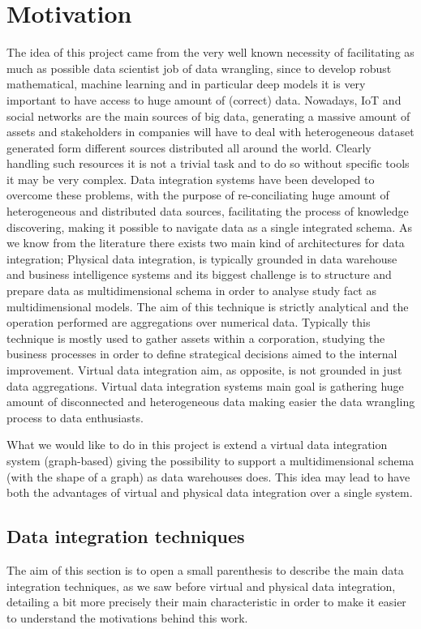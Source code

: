 \documentclass[12pt,a4paper]{report}
\begin{document}
\chapter{Motivation} \label{Motivation}
The idea of this project came from the very well known necessity of facilitating as much as possible data scientist job of data wrangling, since to develop robust mathematical, machine learning and in particular deep models it is very important to have access to huge amount of (correct) data.
%
Nowadays, IoT and social networks are the main sources of big data, generating a massive amount of assets and stakeholders in companies will have to deal with heterogeneous dataset generated form different sources distributed all around the world.
%
Clearly handling such resources it is not a trivial task and to do so without specific tools it may be very complex.
%
Data integration systems have been developed to overcome these problems, with the purpose of re-conciliating huge amount of heterogeneous and distributed data sources, facilitating the process of knowledge discovering, making it possible to navigate data as a single integrated schema.
%
As we know from the literature there exists two main kind of architectures for data integration;
%
Physical data integration, is typically grounded in data warehouse and business intelligence systems and its biggest challenge is to structure and prepare data as multidimensional schema in order to analyse study fact as multidimensional models.
%
The aim of this technique is strictly analytical and the operation performed are aggregations over numerical data.
%
Typically this technique is mostly used to gather assets within a corporation, studying the business processes in order to define strategical decisions aimed to the internal improvement.
%
Virtual data integration aim, as opposite, is not grounded in just data aggregations.
%
Virtual data integration systems main goal is gathering huge amount of disconnected and heterogeneous data making easier the data wrangling process to data enthusiasts.

What we would like to do in this project is extend a virtual data integration system (graph-based) giving the possibility to support a multidimensional schema (with the shape of a graph) as data warehouses does.
%
This idea may lead to have both the advantages of virtual and physical data integration over a single system.

\section{Data integration techniques}
The aim of this section is to open a small parenthesis to describe the main data integration techniques, as we saw before virtual and physical data integration, detailing a bit more precisely their main characteristic in order to make it easier to understand the motivations behind this work.
\end{document}

